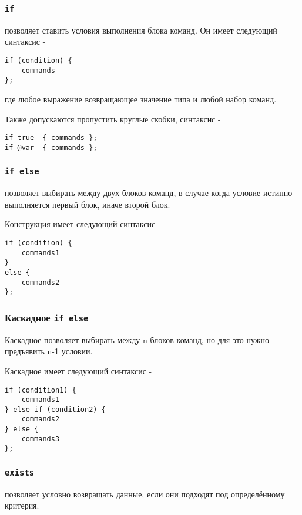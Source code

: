 \documentclass[a4paper, 14pt]{extarticle}
\begin{document}
\subsubsection{\lstinline`if`}

 позволяет ставить условия выполнения блока команд. Он имеет следующий синтаксис -
\begin{lstlisting}[numbers=none]
if (condition) {
	commands
};
\end{lstlisting}
где  любое выражение возвращающее значение типа \bool{} и  любой набор команд.

Также допускаются пропустить круглые скобки, синтаксис -
\begin{lstlisting}[numbers=none]
if true  { commands };
if @var  { commands };
\end{lstlisting}

\subsubsection{\lstinline`if else`}

 позволяет выбирать между двух блоков команд, в случае когда условие истинно - выполняется первый блок, иначе второй блок.

Конструкция  имеет следующий синтаксис -
\begin{lstlisting}[numbers=none]
if (condition) {
	commands1
}
else {
	commands2
};
\end{lstlisting}

\subsubsection{Каскадное \lstinline`if else`}

Каскадное  позволяет выбирать между n блоков команд, но для это нужно предъявить n-1 условии.

Каскадное  имеет следующий синтаксис -
\begin{lstlisting}[numbers=none]
if (condition1) {
	commands1
} else if (condition2) {
	commands2
} else {
	commands3
};
\end{lstlisting}

\subsubsection{\lstinline`exists`}

 позволяет условно возвращать данные, если они подходят под определённому критерия.
\end{document}

